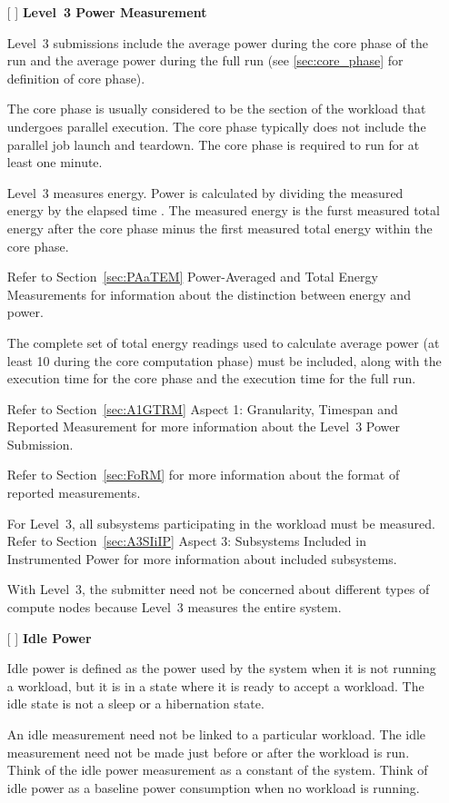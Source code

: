 \begin{itemize}
\newpage
\item[{[ ]}]
\textbf{Level~3 Power Measurement}

Level~3 submissions include the average power during the core phase of the run and the average power during the full run (see \ref{sec:core_phase} for definition of core phase).

The core phase is usually considered to be the section of the workload that undergoes parallel execution. The core phase typically does not include the parallel job launch and teardown.
The core phase is required to run for at least one minute.

Level~3 measures energy. Power is calculated by dividing the measured energy by the elapsed time . The measured energy is the furst measured total energy after the core phase minus the first measured total energy within the core phase.

Refer to Section~\ref{sec:PAaTEM} Power-Averaged and Total Energy Measurements for information about the distinction between energy and power.

The complete set of total energy readings used to calculate average power (at least 10 during the core computation phase) must be included, along with the execution time for the core phase and the execution time for the full run.

Refer to Section~\ref{sec:A1GTRM} Aspect 1: Granularity, Timespan and Reported Measurement for more 
information about the Level~3 Power Submission.

Refer to Section~\ref{sec:FoRM} for more information about the format of reported measurements.

For Level~3, all subsystems participating in the workload must be measured. Refer to 
Section~\ref{sec:A3SIiIP} Aspect 3: Subsystems Included in Instrumented Power for more information about included subsystems.

With Level~3, the submitter need not be concerned about different types of compute nodes because Level~3 measures the entire system.


\item[{[ ]}]
\textbf{Idle Power}

Idle power is defined as the power used by the system when it is not running a workload, but it is in a state where it is ready to accept a workload. The idle state is not a sleep or a hibernation state.

An idle measurement need not be linked to a particular workload. The idle measurement need not be made just before or after the workload is run. Think of the idle power measurement as a constant of the system. Think of idle power as a baseline power consumption when no workload is running. 


\end{itemize}
